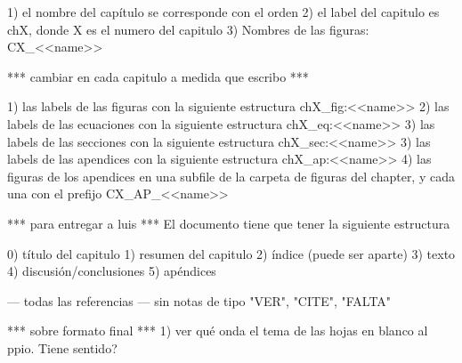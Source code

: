 1) el nombre del capítulo se corresponde con el orden
2) el label del capitulo es chX, donde X es el numero del capitulo
3) Nombres de las figuras: CX_<<name>>


*** cambiar en cada capitulo a medida que escribo ***

1) las labels de las figuras con la siguiente estructura chX_fig:<<name>>
2) las labels de las ecuaciones con la siguiente estructura chX_eq:<<name>>
3) las labels de las secciones con la siguiente estructura chX_sec:<<name>>
3) las labels de las apendices con la siguiente estructura chX_ap:<<name>>
4) las figuras de los apendices en una subfile de la carpeta de figuras del chapter, y cada una con el prefijo CX_AP_<<name>>


*** para entregar a luis ***
El documento tiene que tener la siguiente estructura

0) título del capitulo
1) resumen del capitulo
2) índice (puede ser aparte)
3) texto
4) discusión/conclusiones
5) apéndices

--- todas las referencias
--- sin notas de tipo "VER", "CITE", "FALTA"

*** sobre formato final ***
1) ver qué onda el tema de las hojas en blanco al ppio. Tiene sentido?
